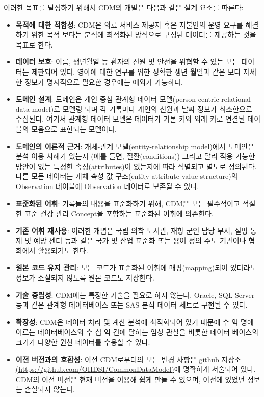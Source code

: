 \documentclass[11pt]{book}
\providecommand{\tightlist}{%
  \setlength{\itemsep}{0pt}\setlength{\parskip}{0pt}}
\theoremstyle{definition}
\theoremstyle{definition}
\theoremstyle{definition}
\theoremstyle{remark}
\begin{document}
이러한 목표를 달성하기 위해서 CDM의 개발은 다음과 같은 설계 요소를
따른다:

\begin{itemize}
\tightlist
\item
  \textbf{목적에 대한 적합성}: CDM은 의료 서비스 제공자 혹은 지불인의
  운영 요구를 해결하기 위한 목적 보다는 분석에 최적화된 방식으로 구성된
  데이터를 제공하는 것을 목표로 한다.
\item
  \textbf{데이터 보호}: 이름, 생년월일 등 환자의 신원 및 안전을 위협할
  수 있는 모든 데이터는 제한되어 있다. 영아에 대한 연구를 위한 정확한
  생년 월일과 같은 보다 자세한 정보가 명시적으로 필요한 경우에는 예외가
  가능하다.
\item
  \textbf{도메인 설계}: 도메인은 개인 중심 관계형 데이터
  모델(person-centric relational data model)로 모델링 되며 각 기록마다
  개인의 신원과 날짜 정보가 최소한으로 수집된다. 여기서 관계형 데이터
  모델은 데이터가 기본 키와 외래 키로 연결된 테이블의 모음으로 표현되는
  모델이다.
\item
  \textbf{도메인의 이론적 근거}: 개체-관계 모델(entity-relationship
  model)에서 도메인은 분석 이용 사례가 있는지 (예를 들면,
  질환(conditions)) 그리고 달리 적용 가능한 방안이 없는 특정한
  속성(attributes)이 있는지에 따라 식별되고 별도로 정의된다. 다른 모든
  데이터는 개체-속성-값 구조(entity-attribute-value structure)의
  Observation 테이블에 Observation 데이터로 보존될 수 있다.
\item
  \textbf{표준화된 어휘}: 기록들의 내용을 표준화하기 위해, CDM은 모든
  필수적이고 적절한 표준 건강 관리 Concept을 포함하는 표준화된 어휘에
  의존한다.
\item
  \textbf{기존 어휘 재사용}: 이러한 개념은 국립 의학 도서관, 재향 군인
  담당 부서, 질병 통제 및 예방 센터 등과 같은 국가 및 산업 표준화 또는
  용어 정의 주도 기관이나 협회에서 활용되기도 한다.
\item
  \textbf{원본 코드 유지 관리}: 모든 코드가 표준화된 어휘에
  매핑(mapping)되어 있더라도 정보가 소실되지 않도록 원본 코드도
  저장한다. 
\item
  \textbf{기술 중립성}: CDM에는 특정한 기술을 필요로 하지 않는다.
  Oracle, SQL Server 등과 같은 관계형 데이터베이스 또는 SAS 분석 데이터
  세트로 구현될 수 있다. 
\item
  \textbf{확장성}: CDM은 데이터 처리 및 계산 분석에 최적화되어 있기
  때문에 수 억 명에 이르는 데이터베이스와 수 십 억 건에 달하는 임상
  관찰을 비롯한 데이터 베이스의 크기가 다양한 원천 데이터를 수용할 수
  있다. 
\item
  \textbf{이전 버전과의 호환성}: 이전 CDM로부터의 모든 변경 사항은
  github 저장소
  \href{https://github.com/OHDSI/CommonDataModel}{(https://github.com/OHDSI/CommonDataModel)}에
  명확하게 서술되어 있다. CDM의 이전 버전은 현재 버전을 이용해 쉽게 만들
  수 있으며, 이전에 있었던 정보는 손실되지 않는다.
\end{itemize}
\end{document}
